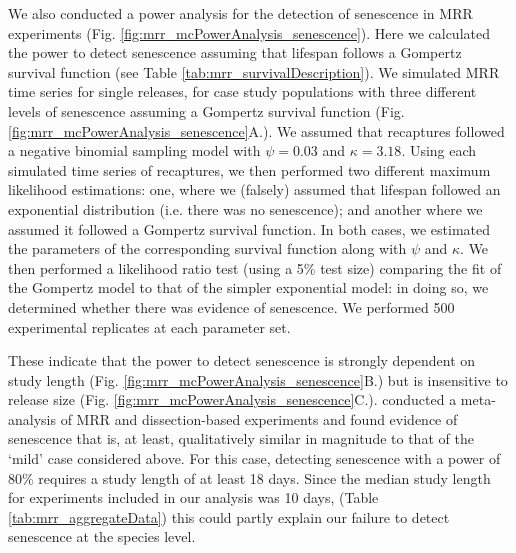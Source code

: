 \documentclass[12pt]{article}
\begin{document}
We also conducted a power analysis for the detection of senescence in MRR experiments (Fig. \ref{fig:mrr_mcPowerAnalysis_senescence}). Here we calculated the power to detect senescence assuming that lifespan follows a Gompertz survival function (see Table \ref{tab:mrr_survivalDescription}). We simulated MRR time series for single releases, for case study populations with three different levels of senescence assuming a Gompertz survival function (Fig. \ref{fig:mrr_mcPowerAnalysis_senescence}A.). We assumed that recaptures followed a negative binomial sampling model with $\psi=0.03$ and $\kappa=3.18$. Using each simulated time series of recaptures, we then performed two different maximum likelihood estimations: one, where we (falsely) assumed that lifespan followed an exponential distribution (i.e. there was no senescence); and another where we assumed it followed a Gompertz survival function. In both cases, we estimated the parameters of the corresponding survival function along with $\psi$ and $\kappa$. We then performed a likelihood ratio test (using a 5\% test size) comparing the fit of the Gompertz model to that of the simpler exponential model: in doing so, we determined whether there was evidence of senescence. We performed 500 experimental replicates at each parameter set.

These indicate that the power to detect senescence is strongly dependent on study length (Fig. \ref{fig:mrr_mcPowerAnalysis_senescence}B.) but is insensitive to release size (Fig. \ref{fig:mrr_mcPowerAnalysis_senescence}C.). \cite{clements1981analysis} conducted a meta-analysis of MRR and dissection-based experiments and found evidence of senescence that is, at least, qualitatively similar in magnitude to that of the `mild' case considered above. For this case, detecting senescence with a power of 80\% requires a study length of at least 18 days. Since the median study length for experiments included in our analysis was 10 days, (Table \ref{tab:mrr_aggregateData}) this could partly explain our failure to detect senescence at the species level.
\end{document}
